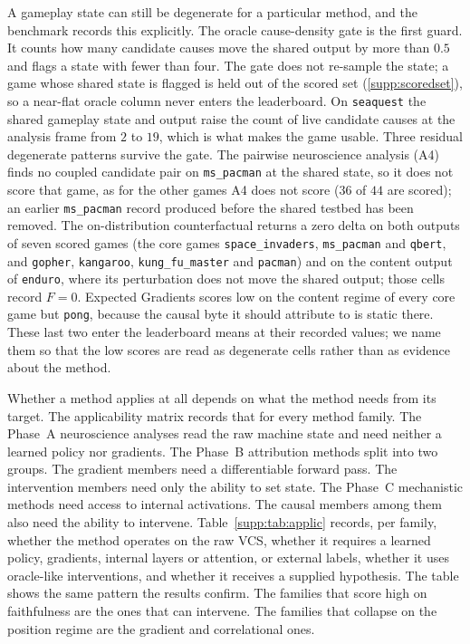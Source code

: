 A gameplay state can still be degenerate for a particular method, and the benchmark records
this explicitly. The oracle cause-density gate is the first guard. It
counts how many candidate causes move the shared output by more than $0.5$ and flags a state with
fewer than four. The gate does not re-sample the state; a game whose shared state is flagged is
held out of the scored set (\Sectionname\ref{supp:scoredset}), so a near-flat oracle column never
enters the leaderboard. On \texttt{seaquest} the shared gameplay state and output raise the count
of live candidate causes at the analysis frame from $2$ to $19$, which is what makes the game
usable. Three residual degenerate patterns survive the gate. The pairwise neuroscience analysis (A4)
finds no coupled candidate pair on \texttt{ms\_pacman} at the shared state, so it does not score
that game, as for the other games A4 does not score ($36$ of $44$ are scored); an earlier
\texttt{ms\_pacman} record produced before the shared testbed has been removed. The on-distribution counterfactual returns a zero delta
on both outputs of seven scored games (the core games \texttt{space\_invaders}, \texttt{ms\_pacman}
and \texttt{qbert}, and \texttt{gopher}, \texttt{kangaroo}, \texttt{kung\_fu\_master} and
\texttt{pacman}) and on the content output of \texttt{enduro}, where its perturbation does not
move the shared output; those cells record $F=0$. Expected Gradients scores low on the
content regime of every core game but \texttt{pong}, because the causal byte it should attribute to
is static there. These last two enter the leaderboard means at their recorded values; we name
them so that the low scores are read as degenerate cells rather than as evidence about the
method.

Whether a method applies at all depends on what the method needs from its target. The
applicability matrix records that for every method family. The Phase~A neuroscience analyses
read the raw machine state and need neither a learned policy nor gradients. The Phase~B
attribution methods split into two groups. The gradient members need a differentiable forward
pass. The intervention members need only the ability to set state. The Phase~C mechanistic
methods need access to internal activations. The causal members among them also need the
ability to intervene. Table~\ref{supp:tab:applic} records, per family, whether the method
operates on the raw VCS, whether it requires a learned policy, gradients, internal layers or
attention, or external labels, whether it uses oracle-like interventions, and whether it
receives a supplied hypothesis. The table shows the same pattern the results confirm. The
families that score high on faithfulness are the ones that can intervene. The families that
collapse on the position regime are the gradient and correlational ones.

